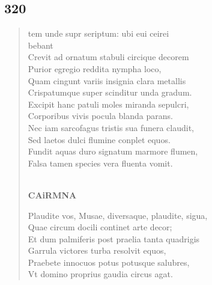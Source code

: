 \documentclass[11pt, a4paper]{report}
\begin{document}
            \subsection*{320}
      \begin{verse}
      tem unde supr seriptum: ubi eui ceirei \\ bebant \\ Crevit ad ornatum stabuli circique decorem \\ Purior egregio reddita nympha loco, \\ Quam cingunt variis insignia clara metallis \\ Crispatumque super scinditur unda gradum. \\ Excipit hanc patuli moles miranda sepulcri, \\ Corporibus vivis pocula blanda parans. \\ Nec iam sarcofagus tristis sua funera claudit, \\ Sed laetos dulci flumine conplet equos. \\ Fundit aquas duro signatum marmore flumen, \\ Falsa tamen species vera fluenta vomit. \\ 
        ﻿\pagebreak 
     \marginpar{[264]} \begin{center} \textbf{CAiRMNA} \end{center}Plaudite vos, Musae, diversaque, plaudite, sigua, \\ Quae circum docili continet arte decor; \\ Et dum palmiferis post praelia tanta quadrigis \\ Garrula victores turba resolvit equos, \\ Praebete innocuos potus potusque salubres, \\ Vt domino proprius gaudia circus agat. \\ 
      \end{verse}
  
\end{document}
